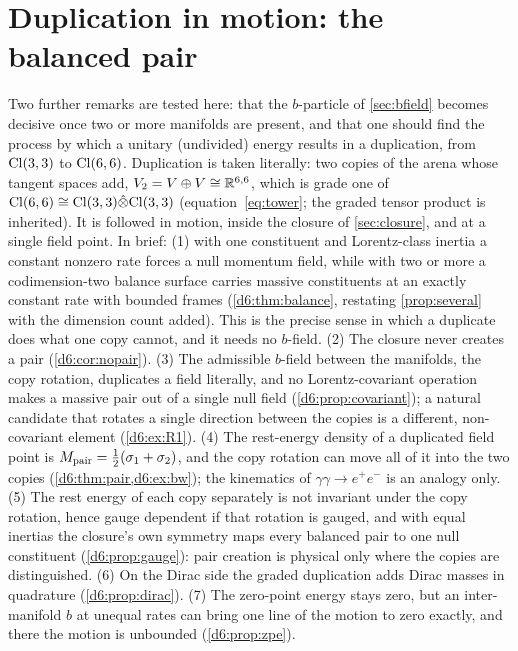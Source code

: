 
\section{Duplication in motion: the balanced pair}
\label{d6:sec:main}

Two further remarks are tested here: that the $b$-particle of \cref{sec:bfield} becomes decisive once two or more manifolds are
present, and that one should find the process by which a unitary (undivided) energy results in a duplication, from $\mathrm{Cl}(3,3)$ to
$\mathrm{Cl}(6,6)$. Duplication is taken literally: two copies of the arena whose tangent spaces add, $V_2=V\oplus V\cong\mathbb{R}^{6,6}$, which is grade
one of $\mathrm{Cl}(6,6)\cong\mathrm{Cl}(3,3)\hat\otimes\mathrm{Cl}(3,3)$ (equation~\cref{eq:tower}; the graded tensor product is inherited). It is followed in
motion, inside the closure of \cref{sec:closure}, and at a single field point. In brief:
(1) with one constituent and Lorentz-class inertia a constant nonzero rate forces a null momentum field, while with two or more a
codimension-two balance surface carries massive constituents at an exactly constant rate with bounded frames (\cref{d6:thm:balance},
restating \cref{prop:several} with the dimension count added). This is the precise sense in which a duplicate does what one copy
cannot, and it needs no $b$-field. (2) The closure never creates a pair (\cref{d6:cor:nopair}). (3) The admissible $b$-field between the
manifolds, the copy rotation, duplicates a field literally, and no Lorentz-covariant operation makes a massive pair out of a single null
field (\cref{d6:prop:covariant}); a natural candidate that rotates a single direction between the copies is a different, non-covariant
element (\cref{d6:ex:R1}).
(4) The rest-energy density of a duplicated field point is $M_{\rm pair}=\tfrac12(\sigma_1+\sigma_2)$, and the copy rotation can move all of it into
the two copies (\cref{d6:thm:pair,d6:ex:bw}); the kinematics of $\gamma\gamma\to e^+e^-$ is an analogy only. (5) The rest energy of each copy separately is
not invariant under the copy rotation, hence gauge dependent if that rotation is gauged, and with equal inertias the closure's own symmetry maps every balanced pair to one null constituent
(\cref{d6:prop:gauge}): pair creation is physical only where the copies are distinguished. (6) On the Dirac side the graded duplication adds
Dirac masses in quadrature (\cref{d6:prop:dirac}). (7) The zero-point energy stays zero, but an inter-manifold $b$ at unequal rates can
bring one line of the motion to zero exactly, and there the motion is unbounded (\cref{d6:prop:zpe}).

